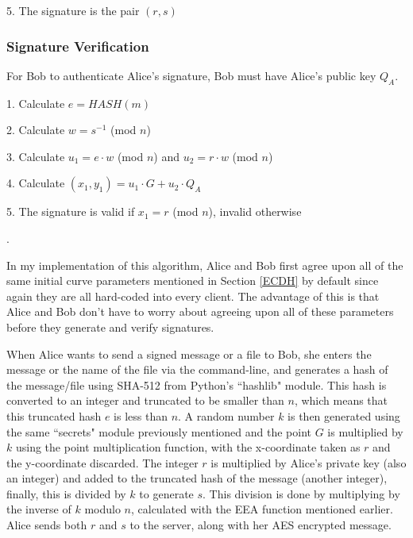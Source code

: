\documentclass[12pt,a4paper]{article}
\begin{document}
5. \space The signature is the pair $(r,s)$

\subsubsection{Signature Verification} \noindent \label{Signature Verification}
For Bob to authenticate Alice's signature, Bob must have Alice's public key $Q_A$.

\vspace{1mm}

1. \space Calculate $e = HASH(m)$

2. \space Calculate $w = s^{-1}$ (mod $n$)

3. \space Calculate $u_1 = e \cdot w$ (mod $n$) and $u_2 = r \cdot w$ (mod $n$)

4. \space Calculate $(x_1,y_1) = u_1 \cdot G + u_2 \cdot Q_A$

5. \space The signature is valid if $x_1 = r$ (mod $n$), invalid otherwise

\vspace{2mm}

\cite{jurivsic1997elliptic,koblitz2000state,hankerson2003guide,anoop2007elliptic,silverman2009arithmetic,brown2009standards}.

\vspace{5mm}

In my implementation of this algorithm, Alice and Bob first agree upon all of the same initial curve parameters mentioned in Section \ref{ECDH} 
by default since again they are all hard-coded into every client. 
The advantage of this is that Alice and Bob don't have to worry about agreeing upon all of these parameters before they generate and verify signatures. 

When Alice wants to send a signed message or a file to Bob, she enters the message or the name of the file via the command-line, 
and generates a hash of the message/file using SHA-512 from Python's ``hashlib" module. 
This hash is converted to an integer and truncated to be smaller than $n$, which means that this truncated hash $e$ is less than $n$. 
A random number $k$ is then generated using the same ``secrets" module previously mentioned and the point $G$ is multiplied by $k$ using 
the point multiplication function, with the x-coordinate taken as $r$ and the y-coordinate discarded. 
The integer $r$ is multiplied by Alice's private key (also an integer) and added to the truncated hash of the message (another integer), 
finally, this is divided by $k$ to generate $s$. 
This division is done by multiplying by the inverse of $k$ modulo $n$, calculated with the EEA function mentioned earlier. 
Alice sends both $r$ and $s$ to the server, along with her AES encrypted message. 
\end{document}
